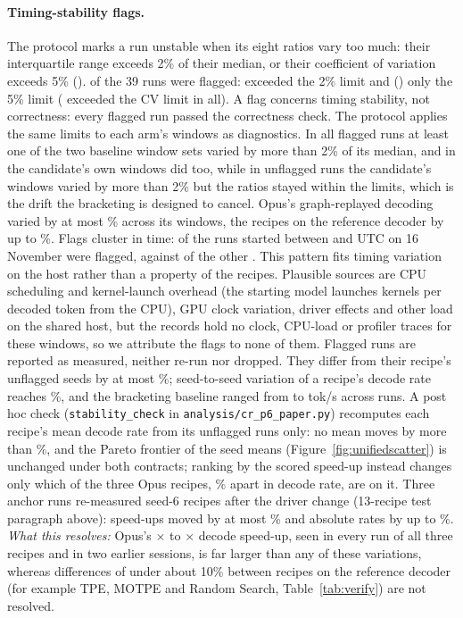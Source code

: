 \documentclass{article}
\begin{document}
\paragraph{Timing-stability flags.} The protocol marks a run unstable when its eight ratios vary too much: their interquartile range exceeds 2\% of their median, or their coefficient of variation exceeds 5\% (). \CRSixUnstableRuns{} of the 39 runs were flagged: \CRSixFlagDrift{} exceeded the 2\% limit and \CRSixFlagCVOnly{} (\CRSixFlagCVOnlyName) only the 5\% limit (\CRSixFlagCV{} exceeded the CV limit in all). A flag concerns timing stability, not correctness: every flagged run passed the correctness check. The protocol applies the same limits to each arm's windows as diagnostics. In all \CRSixFlagBaseDrift{} flagged runs at least one of the two baseline window sets varied by more than 2\% of its median, and in \CRSixFlagCandDrift{} the candidate's own windows did too, while in \CRSixCancelled{} unflagged runs the candidate's windows varied by more than 2\% but the ratios stayed within the limits, which is the drift the bracketing is designed to cancel. Opus's graph-replayed decoding varied by at most \CRSixOpusWinIQR\% across its windows, the recipes on the reference decoder by up to \CRSixRefWinIQR\%. Flags cluster in time: \CRSixBlockFlags{} of the \CRSixBlockRuns{} runs started between \CRSixBlockStart{} and \CRSixBlockEnd{} UTC on 16 November were flagged, against \CRSixRestFlags{} of the other \CRSixRestRuns. This pattern fits timing variation on the host rather than a property of the recipes. Plausible sources are CPU scheduling and kernel-launch overhead (the starting model launches \CRIAKernBase{} kernels per decoded token from the CPU), GPU clock variation, driver effects and other load on the shared host, but the records hold no clock, CPU-load or profiler traces for these windows, so we attribute the flags to none of them. Flagged runs are reported as measured, neither re-run nor dropped. They differ from their recipe's unflagged seeds by at most \CRSixUnstableMaxDev\%; seed-to-seed variation of a recipe's decode rate reaches \CRSixSeedCVMax\%, and the bracketing baseline ranged from \CRSixBracketLo{} to \CRSixBracketHi{} tok/s across runs. A post hoc check (\texttt{stability\_check} in \texttt{analysis/cr\_p6\_paper.py}) recomputes each recipe's mean decode rate from its unflagged runs only: no mean moves by more than \CRSixStableShiftMax\%, and the Pareto frontier of the seed means (Figure~\ref{fig:unifiedscatter}) is unchanged under both contracts; ranking by the scored speed-up instead changes only which of the three Opus recipes, \CRSixOpDecSpread\% apart in decode rate, are on it. Three anchor runs re-measured seed-6 recipes after the driver change (13-recipe test paragraph above): speed-ups moved by at most \CRSixAnchorSpeedMax\% and absolute rates by up to \CRSixAnchorDecodeMax\%. \emph{What this resolves:} Opus's \CRSixSpeedLo$\times$ to \CRSixSpeedHi$\times$ decode speed-up, seen in every run of all three recipes and in two earlier sessions, is far larger than any of these variations, whereas differences of under about 10\% between recipes on the reference decoder (for example TPE, MOTPE and Random Search, Table~\ref{tab:verify}) are not resolved.
\end{document}
